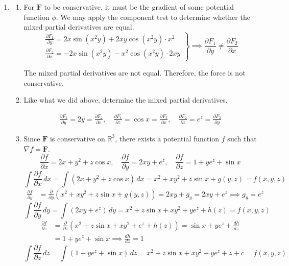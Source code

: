 \documentclass[a4paper, 12pt]{article}
\begin{document}
\begin{enumerate}[leftmargin=*,label=\textbf{\arabic*.}]
\item \begin{enumerate}[leftmargin=*,label=\textbf{\alph*.}]
\item For $\mathbf{F}$ to be conservative, it must be the gradient of some potential function $\phi$. We may apply the component test to determine whether the mixed partial derivatives are equal.
\[
\left.
\begin{array}{l}
\displaystyle\frac{\partial{F}_1}{\partial y}=2x\sin\left(x^2y\right)+2xy\cos\left(x^2y\right)\cdot x^2\\[1em]
\displaystyle\frac{\partial{F}_2}{\partial x}=-2x\sin\left(x^2y\right)-x^2\cos\left(x^2y\right)\cdot 2xy
\end{array}\right\}\implies\displaystyle\frac{\partial{F}_1}{\partial y}\neq\displaystyle\frac{\partial{F}_2}{\partial x}
\]

The mixed partial derivatives are not equal. Therefore, the force is not conservative.

\item Like what we did above, determine the mixed partial derivatives.

\[
\begin{array}{c}
\displaystyle\frac{\partial{F}_1}{\partial y}=2y=\frac{\partial{F}_2}{\partial x},\quad\frac{\partial{F}_1}{\partial z}=\cos x=\frac{\partial{F}_3}{\partial x},\quad\frac{\partial{F}_2}{\partial z}={e}^z=\frac{\partial{F}_3}{\partial y}
\end{array}
\]

\item Since $\mathbf{F}$ is conservative on $\mathbb{R}^3$, there exists a potential function $f$ such that $\nabla f=\mathbf{F}$.
\[\frac{\partial f}{\partial x}=2x+y^2+z\cos x,\quad\frac{\partial f}{\partial y}=2xy+{e}^z,\quad\frac{\partial f}{\partial z}=1+y{e}^z+\sin x\]
\[\int\frac{\partial f}{\partial x}\,dx=\int\left(2x+y^2+z\cos x\right)\,dx=x^2+xy^2+z\sin x+g(y,z)=f(x,y,z)\]
\begin{align*}\frac{\partial f}{\partial y}&=\frac{\partial}{\partial y}\left(x^2+xy^2+z\sin x+g(y,z)\right)=2xy+g_y=2xy+{e}^z\implies g_y={e}^z\end{align*}
\[\int\frac{\partial f}{\partial y}\,dy=\int\left(2xy+{e}^z\right)\,dy=x^2+z\sin x+xy^2+y{e}^z+h(z)=f(x,y,z)\]
\begin{align*}\frac{\partial f}{\partial z}&=\frac{\partial}{\partial z}\left(x^2+z\sin x+xy^2+{e}^z+h(z)\right)=\sin x+y{e}^z+\frac{dh}{dz}\\[1em]&=1+y{e}^z+\sin x\implies\frac{dh}{dz}=1\end{align*}
\[\int\frac{\partial f}{\partial z}\,dz=\int\left(1+y{e}^z+\sin x\right)\,dz=x^2+z\sin x+xy^2+y{e}^z+z+c=f(x,y,z)\]


\end{enumerate}
\end{enumerate}
\end{document}
